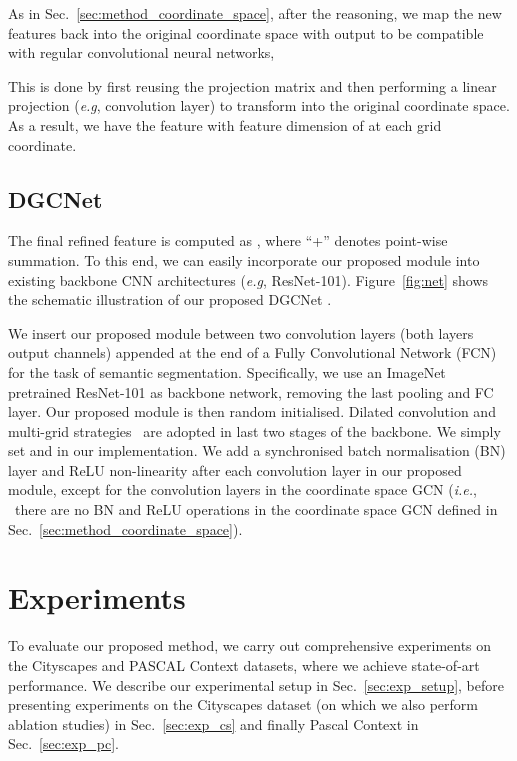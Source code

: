 \documentclass{bmvc2k}
\def\eg{\emph{e.g}\bmvaOneDot}
\def\ie{\textit{i.e.}}
\begin{document}
As in Sec.~\ref{sec:method_coordinate_space}, after the reasoning, we map the new features  back into the original coordinate space with output  to be compatible with regular convolutional neural networks,
 
This is done by first reusing the projection matrix  and then performing a linear projection (\eg,  convolution layer) to transform   into the original coordinate space. 
As a result, we have the feature  with feature dimension of  at each grid coordinate.

\subsection{DGCNet}
\label{sec:network_arch}

The final refined feature is computed as 
,
where ``+'' denotes point-wise summation.
To this end, we can easily incorporate our proposed module into existing backbone CNN architectures (\eg, ResNet-101).
Figure~\ref{fig:net} shows the schematic illustration of our proposed DGCNet .

We insert our proposed module between two  convolution layers (both layers output  channels) appended at the end of a Fully Convolutional Network (FCN) for the task of semantic segmentation.
Specifically, we use an ImageNet pretrained ResNet-101 as backbone network, removing the last pooling and FC layer.
Our proposed module is then random initialised.
Dilated convolution and multi-grid strategies~\cite{DAnet} are adopted in last two stages of the backbone.
We simply set  and  in our implementation.
We add a synchronised batch normalisation (BN) layer and ReLU non-linearity after each convolution layer in our proposed module, except for the convolution layers in the coordinate space GCN (\ie, ~there are no BN and ReLU operations in the coordinate space GCN defined in Sec.~\ref{sec:method_coordinate_space}).  \section{Experiments}
\label{sec:exp}
To evaluate our proposed method, we carry out comprehensive experiments on the Cityscapes \cite{Cityscapes} and PASCAL Context \cite{mottaghi_cvpr14} datasets, where we achieve state-of-art performance.
We describe our experimental setup in Sec.~\ref{sec:exp_setup}, before presenting experiments on the Cityscapes dataset (on which we also perform ablation studies) in Sec.~\ref{sec:exp_cs} and finally Pascal Context in Sec.~\ref{sec:exp_pc}.
\end{document}
